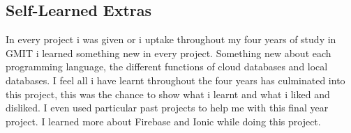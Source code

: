 \subsection{Self-Learned Extras}
In every project i was given or i uptake throughout my four years of study in GMIT i learned something new in every project. Something new about each programming language, the different functions of cloud databases and local databases. I feel all i have learnt throughout the four years has culminated into this project, this was the chance to show what i learnt and what i liked and disliked. I even used particular past projects to help me with this final year project. I learned more about Firebase and Ionic while doing this project. %
